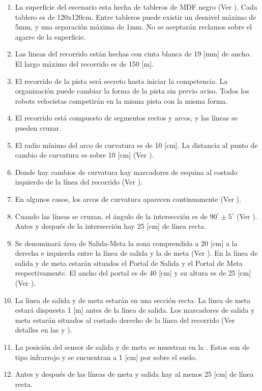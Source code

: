 \begin{enumerate}
  \item La superficie del escenario esta hecha de tableros de MDF negro (Ver ). Cada tablero es de 120x120cm. Entre tableros puede existir un desnivel máximo de 5mm, y una separación máxima de 1mm. No se aceptarán reclamos sobre el agarre de la superficie.
  
  \item Las lineas del recorrido están hechas con cinta blanca de 19 [mm] de ancho. El largo máximo del recorrido es de 150 [m].

  \item El recorrido de la pista será secreto hasta iniciar la competencia. La organización puede cambiar la forma de la pista sin previo aviso. Todos los robots velocistas competirán en la misma pista con la misma forma.

  \item El recorrido está compuesto de segmentos rectos y arcos, y las líneas se pueden cruzar.
  
  \item El radio mínimo del arco de curvatura es de 10 [cm]. La distancia al punto de cambio de curvatura es sobre 10 [cm] (Ver ).
  
  \item Donde hay cambios de curvatura hay marcadores de esquina al costado izquierdo de la línea del recorrido (Ver ). 
    
  \item En algunos casos, los arcos de curvatura aparecen continuamente (Ver ).
  
  \item Cuando las líneas se cruzan, el ángulo de la intersección es de $90^\circ \pm 5^\circ$ (Ver ). Antes y después de la intersección hay 25 [cm] de línea recta.

  \item Se denominará área de Salida-Meta la zona comprendida a 20 [cm] a la derecha e izquierda entre la línea de salida y la de meta (Ver ). En la línea de salida y de meta estarán situados el Portal de Salida y el Portal de Meta respectivamente. El ancho del portal es de 40 [cm] y su altura es de 25 [cm] (Ver ).

  \item La línea de salida y de meta estarán en una sección recta. La línea de meta estará dispuesta 1 [m] antes de la línea de salida. Los marcadores de salida y meta estarán situados al costado derecho de la línea del recorrido (Ver detalles en las  y ).
  
  \item La posición del sensor de salida y de meta se muestran en la . Estos son de tipo infrarrojo y se encuentran a 1 [cm] por sobre el suelo.

  \item Antes y después de las líneas de meta y salida hay al menos 25 [cm] de línea recta.


\end{enumerate}

